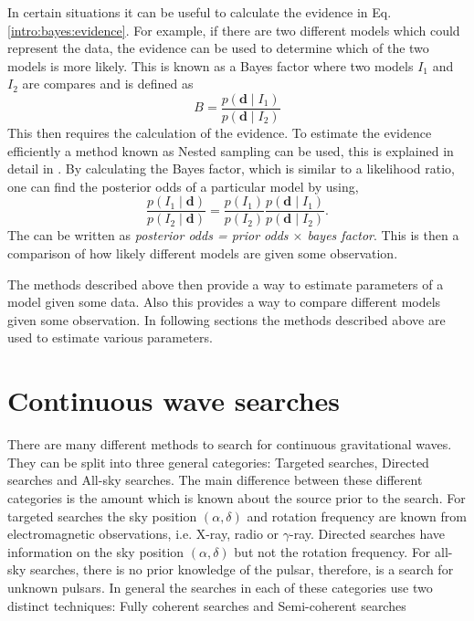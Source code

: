 In certain situations it can be useful to calculate the evidence in Eq.\ref{intro:bayes:evidence}. 
For example, if there are two different models which could represent the data, the evidence can be used to determine which of the two models is more likely.
This is known as a Bayes factor where two models $I_1$ and $I_2$ are compares and is defined as
\begin{equation}
B = \frac{p({\bm d} \mid I_1)}{p({\bm d} \mid I_2)}
\end{equation}
This then requires the calculation of the evidence.
To estimate the evidence efficiently a method known as Nested sampling can be used, this is explained in detail in \citep{skilling2006NestedSampling,speagle2019DynestyDynamic}.
By calculating the Bayes factor, which is similar to a likelihood ratio, one can find the posterior odds of a particular model by using,
\begin{equation}
\frac{p(I_1 \mid \mathbf{d})}{p(I_2 \mid \mathbf{d})} = \frac{p(I_1)}{p(I_2)} \frac{p(\mathbf{d} \mid I_1)}{p(\mathbf{d} \mid I_2)}.
\end{equation}
The can be written as \textit{posterior odds = prior odds $\times$ bayes factor}. This is then a comparison of how likely different models are given some observation. 

The methods described above then provide a way to estimate parameters of a model given some data. 
Also this provides a way to compare different models given some observation.
In following sections the methods described above are used to estimate various parameters.


\section{\label{searchcw:search} Continuous wave searches}

There are many different methods to search for continuous gravitational waves.
They can be split into three general categories: Targeted searches, Directed searches and All-sky searches.
The main difference between these different categories is the amount which is known about the source prior to the search.
For targeted searches the sky position $(\alpha,\delta)$ and rotation frequency are known from electromagnetic observations, i.e. X-ray, radio or $\gamma$-ray.
Directed searches have information on the sky position $(\alpha,\delta)$ but not the rotation frequency.
For all-sky searches, there is no prior knowledge of the pulsar, therefore, is a search for unknown pulsars.
In general the searches in each of these categories use two distinct techniques: Fully coherent searches and Semi-coherent searches

